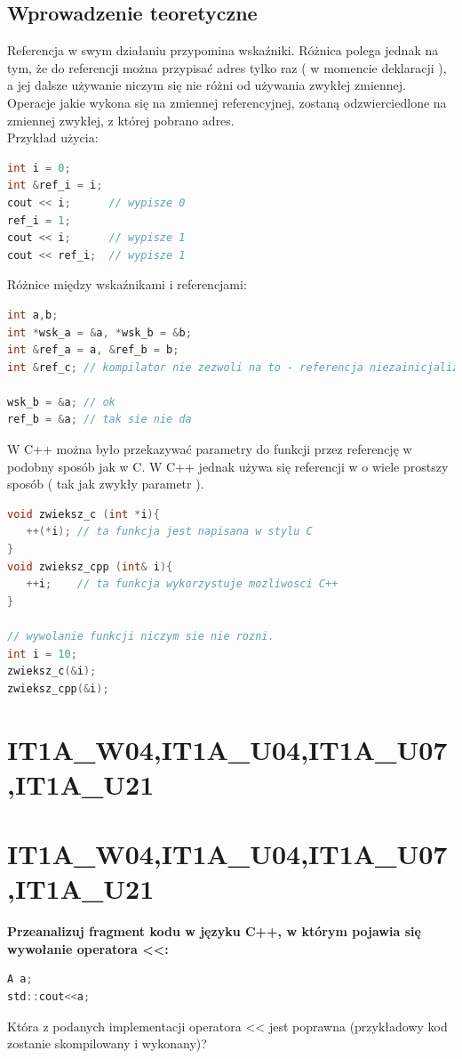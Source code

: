 \subsection{Wprowadzenie teoretyczne}
Referencja w swym działaniu przypomina wskaźniki. Różnica polega jednak na tym, że do referencji można przypisać adres tylko raz ( w momencie deklaracji ), a jej dalsze używanie niczym się nie różni od używania zwykłej zmiennej. Operacje jakie wykona się na zmiennej referencyjnej, zostaną odzwierciedlone na zmiennej zwykłej, z której pobrano adres.\\
Przykład użycia:
\begin{lstlisting}[language=c]
int i = 0;
int &ref_i = i;
cout << i;      // wypisze 0
ref_i = 1;
cout << i;      // wypisze 1
cout << ref_i;  // wypisze 1
\end{lstlisting}
Różnice między wskaźnikami i referencjami:
\begin{lstlisting}[language=c]
int a,b;
int *wsk_a = &a, *wsk_b = &b;
int &ref_a = a, &ref_b = b;
int &ref_c; // kompilator nie zezwoli na to - referencja niezainicjalizowana

wsk_b = &a; // ok
ref_b = &a; // tak sie nie da
\end{lstlisting}
W C++ można było przekazywać parametry do funkcji przez referencję w podobny sposób jak w C. W C++ jednak używa się referencji w o wiele prostszy sposób ( tak jak zwykły parametr ).

\begin{lstlisting}[language=c]
void zwieksz_c (int *i){
   ++(*i); // ta funkcja jest napisana w stylu C
}
void zwieksz_cpp (int& i){
   ++i;    // ta funkcja wykorzystuje mozliwosci C++
}

// wywolanie funkcji niczym sie nie rozni.
int i = 10;
zwieksz_c(&i);
zwieksz_cpp(&i);
\end{lstlisting}

\section{IT1A\_W04,IT1A\_U04,IT1A\_U07,IT1A\_U21} 

\section{IT1A\_W04,IT1A\_U04,IT1A\_U07,IT1A\_U21} 
\textbf{Przeanalizuj fragment kodu w języku C++, w którym pojawia się wywołanie operatora <<:}
\begin{lstlisting}[language=c]
A a;
std::cout<<a;
\end{lstlisting}
Która z podanych implementacji operatora << jest poprawna (przykładowy kod zostanie skompilowany i wykonany)?

